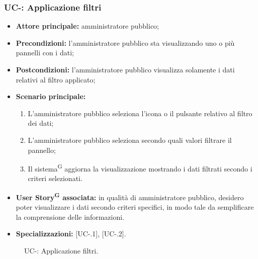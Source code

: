 \documentclass[8pt]{article}
\newcommand{\glossterm}[1]{#1\textsuperscript{G}} %
\begin{document}
\subsubsection*{UC-\ucnumber: Applicazione filtri}
\begin{itemize}
    \item \textbf{Attore principale:} amministratore pubblico;
    \item \textbf{Precondizioni:} l’amministratore pubblico sta visualizzando uno o più pannelli con i dati;
    \item \textbf{Postcondizioni:} l’amministratore pubblico visualizza solamente i dati relativi al filtro
applicato;
    \item \textbf{Scenario principale:}
        \begin{enumerate}
        \item L’amministratore pubblico seleziona l’icona o il pulsante relativo al filtro dei dati;
        \item L’amministratore pubblico seleziona secondo quali valori filtrare il pannello;
        \item Il \glossterm{sistema} aggiorna la visualizzazione mostrando i dati filtrati secondo i criteri selezionati.
        \end{enumerate}
    \item \textbf{\glossterm{User Story} associata:} in qualità di amministratore pubblico, desidero poter
        visualizzare i dati secondo criteri specifici, in modo tale da semplificare la comprensione
        delle informazioni.
    \item \textbf{Specializzazioni:} [UC-\theuc .1], [UC-\theuc .2].
\end{itemize}
\begin{figure}[ht!]
    \centering
    \caption{UC-\theuc: Applicazione filtri.}
    \label{fig:UC-\theuc: Applicazione filtri}
\end{figure}
\setcounter{specone}{0}
\end{document}
